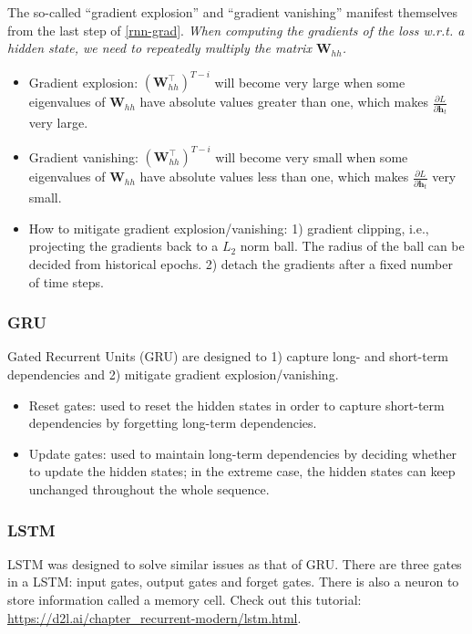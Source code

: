The so-called ``gradient explosion'' and ``gradient vanishing'' manifest themselves from the last step of \eqref{rnn-grad}.
\emph{When computing the gradients of the loss w.r.t. a hidden state, we need to repeatedly multiply the matrix $\bm{W}_{hh}$.}  
    \begin{itemize}
        \item Gradient explosion: $\left(\bm{W}_{hh}^\top \right)^{T-i}$ will become 
        very large when some eigenvalues of $\bm{W}_{hh}$ have absolute values greater than one, which makes $\frac{\partial L}{\partial \bm{h}_t}$ very large.
        \item Gradient vanishing: $\left(\bm{W}_{hh}^\top \right)^{T-i}$ will become very small when some eigenvalues of $\bm{W}_{hh}$ have absolute values less than one, which makes $\frac{\partial L}{\partial \bm{h}_t}$ very small.
        \item How to mitigate gradient explosion/vanishing: 1) gradient clipping, i.e., projecting the gradients back to a $L_2$ norm ball. 
        The radius of the ball can be decided from historical epochs.
        2) detach the gradients after a fixed number of time steps.
    \end{itemize}
    
\subsubsection{GRU}
    Gated Recurrent Units (GRU) are designed to 1) capture long- and short-term dependencies and 2) mitigate gradient explosion/vanishing.
    \begin{itemize}
        \item Reset gates: used to reset the hidden states in order to capture short-term dependencies by forgetting long-term dependencies.
        \item Update gates: used to maintain long-term dependencies by deciding whether to update the hidden states; in the extreme case, the hidden states can keep unchanged throughout the whole sequence.
    \end{itemize}
    
\subsubsection{LSTM}
    LSTM was designed to solve similar issues as that of GRU.
    There are three gates in a LSTM: input gates, output gates and forget gates. 
    There is also a neuron to store information called a memory cell.
    Check out this tutorial: \url{https://d2l.ai/chapter_recurrent-modern/lstm.html}.
    
